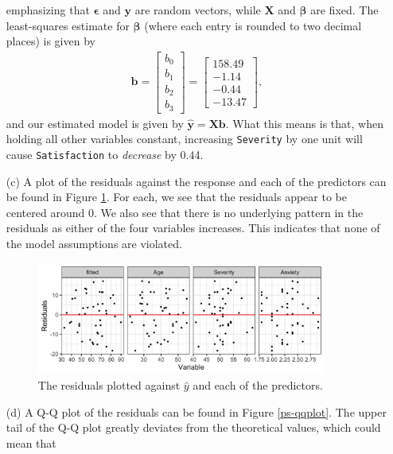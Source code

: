 \documentclass[10pt]{article}
\begin{document}
\begin{itemize}
    emphasizing that \(\bm{\epsilon}\) and \(\mathbf{y}\) are random vectors, while \(\mathbf{X}\) and \(\bm{\beta}\) are fixed. The least-squares estimate
    for \(\bm{\beta}\) (where each entry is rounded to two decimal places) is given by 
    \begin{align*}
        \mathbf{b} = \begin{bmatrix}
            b_0 \\ b_1 \\ b_2 \\ b_3
        \end{bmatrix}
        = \begin{bmatrix}
            158.49 \\ -1.14 \\ -0.44 \\ -13.47
        \end{bmatrix},
    \end{align*}
    and our estimated model is given by \(\hat{\mathbf{y}} = \mathbf{X} \mathbf{b}\). What this means is that, when holding all other variables constant, 
    increasing \texttt{Severity} by one unit will cause \texttt{Satisfaction} to \textsl{decrease} by 0.44.
    \item[(c)] A plot of the residuals against the response and each of the predictors can be found in Figure \ref{ps-residuals}. For each, we see that 
    the residuals appear to be centered around \(0\). We also see that there is no underlying pattern in the residuals as either of the four variables increases. 
    This indicates that none of the model assumptions are violated.
    \begin{figure}
        \centering
        \includegraphics[width = 0.9\textwidth]{img/ps-residuals.png}
        \caption{The residuals plotted against \(\hat{y}\) and each of the predictors.}
        \label{ps-residuals}
    \end{figure}
    \item[(d)] A Q-Q plot of the residuals can be found in Figure \ref{ps-qqplot}. The upper tail of the Q-Q plot greatly deviates from the theoretical values, which could mean that 

\end{itemize}
\end{document}
